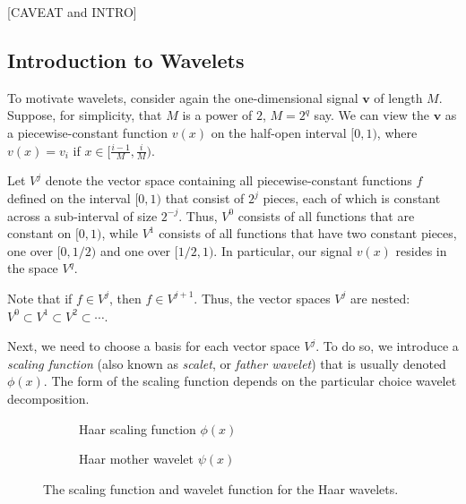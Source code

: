 [CAVEAT and INTRO]

\subsection{Introduction to Wavelets}
To motivate wavelets, consider again the one-dimensional signal $\bm v$ of length $M$.
Suppose, for simplicity, that $M$ is a power of $2$, $M = 2^q$ say.
We can view the $\bm v$ as a piecewise-constant function $v(x)$ on the half-open interval $[0,1)$, where $v(x) = v_i$ if $x \in [\frac{i-1}{M}, \frac{i}{M})$.

Let $V^j$ denote the vector space containing all piecewise-constant functions $f$ defined on the interval $[0,1)$ that consist of $2^j$ pieces, each of which is constant across a sub-interval of size $2^{-j}$.
Thus, $V^0$ consists of all functions that are constant on $[0,1)$, while $V^1$ consists of all functions that have two constant pieces, one over $[0,1/2)$ and one over $[1/2,1)$.
In particular, our signal $v(x)$ resides in the space $V^q$.

Note that if $f \in V^j$, then $f \in V^{j+1}$.
Thus, the vector spaces $V^j$ are nested: $V^0 \subset V^1 \subset V^2 \subset \cdots$.

Next, we need to choose a basis for each vector space $V^j$.
To do so, we introduce a \emph{scaling function} (also known as \emph{scalet}, or \emph{father wavelet}) that is usually denoted $\phi(x)$.
The form of the scaling function depends on the particular choice wavelet decomposition.

\begin{figure}
  \centering
  \begin{subfigure}{0.4\textwidth}
    \centering
    \caption{Haar scaling function $\phi(x)$}
    \label{fig:haar_scaling}
  \end{subfigure}
  \begin{subfigure}{0.4\textwidth}
    \centering
    \caption{Haar mother wavelet $\psi(x)$}
    \label{fig:haar_mother}
  \end{subfigure}
  \caption{The scaling function and wavelet function for the Haar wavelets.}
  \label{fig:haar_1d}
\end{figure}

